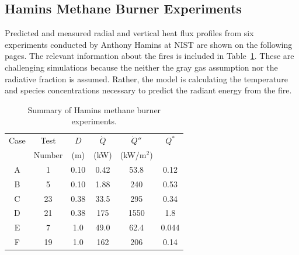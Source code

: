 \clearpage

\subsection{Hamins Methane Burner Experiments}

Predicted and measured radial and vertical heat flux profiles from six experiments conducted by Anthony Hamins at NIST are shown on the following pages. The relevant information about the fires is included in Table~\ref{Hamins_Table}. These are challenging simulations because the neither the gray gas assumption nor the radiative fraction is assumed. Rather, the model is calculating the temperature and species concentrations necessary to predict the radiant energy from the fire.

\begin{table}[ht]
\caption{Summary of Hamins methane burner experiments. }
\begin{center}
\begin{tabular}{|c|c|c|c|c|c|}
\hline
Case     & Test     & $D$  & $\dot{Q}$   &  $\dot{Q}''$   & $Q^*$   \\
         & Number   & (m)  & (kW)        &  (kW/m$^2$)    &         \\ \hline \hline
A        & 1        & 0.10 & 0.42        &  53.8          & 0.12    \\ \hline
B        & 5        & 0.10 & 1.88        &  240           & 0.53    \\ \hline
C        & 23       & 0.38 & 33.5        &  295           & 0.34    \\ \hline
D        & 21       & 0.38 & 175         &  1550          & 1.8     \\ \hline
E        & 7        & 1.0  & 49.0        &  62.4          & 0.044   \\ \hline
F        & 19       & 1.0  & 162         &  206           & 0.14    \\ \hline
\end{tabular}
\end{center}
\label{Hamins_Table}
\end{table}

\newpage

